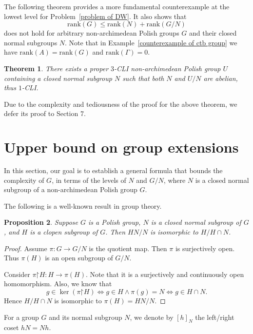 \documentclass[11pt]{amsart}
\newtheorem{theorem}{Theorem}[section]
\newtheorem{proposition}[theorem]{Proposition}
\theoremstyle{definition}
\theoremstyle{remark}
\numberwithin{equation}{section}
\def\rank{{\mathrm{rank}}}
\renewcommand{\restriction}{\mathord{\upharpoonright}}
\def\hier#1{$#1$-CLI}
\begin{document}
The following theorem provides a more fundamental counterexample at the lowest level for Problem~\ref{problem of DW}. It also shows that $$\rank(G)\leq\rank(N)+\rank(G/N)$$
does not hold for arbitrary non-archimedean Polish groups $G$ and their closed normal subgroups $N$. Note that in Example~\ref{counterexample of ctb group} we have $\rank(A)=\rank(G)$ and $\rank(\Gamma)=0$.

\begin{theorem}\label{3-CLI}
There exists a proper \hier{3} non-archimedean Polish group $U$ containing a closed normal subgroup $N$ such that both $N$ and $U/N$ are abelian, thus \hier{1}.
\end{theorem}

Due to the complexity and tediousness of the proof for the above theorem, we defer its proof to Section 7.


\section{Upper bound on group extensions}

In this section, our goal is to establish a general formula that bounds the complexity of $G$, in terms of the levels of $N$ and $G/N$, where $N$ is a closed normal subgroup of a non-archimedean Polish group $G$.

The following is a well-known result in group theory.

\begin{proposition}\label{basic theorem of group homomorphism}
    Suppose $G$ is a Polish group, $N$ is a closed normal subgroup of $G$, and $H$ is a clopen subgroup of $G$. Then $HN/N$ is isomorphic to $H/H\cap N$.
\end{proposition}
\begin{proof}
    Assume $\pi:G\to G/N$ is the quotient map. Then $\pi$ is surjectively open. Thus $\pi(H)$ is an open subgroup of $G/N$.

    Consider $\pi\restriction H:H\to \pi(H)$. Note that it is a surjectively and continuously open homomorphism. Also, we know that
    $$g\in\ker(\pi\restriction H)\Leftrightarrow g\in H\land\pi(g)=N\Leftrightarrow g\in H\cap N.$$
    Hence $H/H\cap N$ is isomorphic to $\pi(H)=HN/N$.
\end{proof}

For a group $G$ and its normal subgroup $N$, we denote by $[h]_N$ the left/right coset $hN=Nh$.
\end{document}

